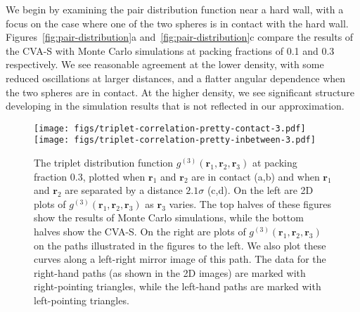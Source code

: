 \documentclass[letterpaper,twocolumn,amsmath,amssymb,pre,aps,10pt]{revtex4-1}
\newcommand{\rr}{\textbf{r}}
\begin{document}
We begin by examining the pair distribution function near a hard wall,
with a focus on the case where one of the two spheres is in contact
with the hard wall.  Figures~\ref{fig:pair-distribution}a
and~\ref{fig:pair-distribution}c compare the results of the CVA-S with
Monte Carlo simulations at packing fractions of 0.1 and 0.3
respectively. We see reasonable agreement at the lower density, with
some reduced oscillations at larger distances, and a flatter angular
dependence when the two spheres are in contact.  At the higher
density, we see significant structure developing in the simulation
results that is not reflected in our approximation.

\begin{figure*}
  \texttt{[image: figs/triplet-correlation-pretty-contact-3.pdf]}
  \vspace{-0.7cm}
\\
  \texttt{[image: figs/triplet-correlation-pretty-inbetween-3.pdf]}
  \vspace{-0.7cm}
  \caption{The triplet distribution function
    $g^{(3)}(\rr_1,\rr_2,\rr_3)$ at packing fraction 0.3, plotted when
    $\rr_1$ and $\rr_2$ are in contact (a,b) and when $\rr_1$ and
    $\rr_2$ are separated by a distance $2.1\sigma$ (c,d). On the left
    are 2D plots of $g^{(3)}(\rr_1,\rr_2,\rr_3)$ as $\rr_3$
    varies. %
%
    The top halves of these figures show the results of Monte Carlo
    simulations, while the bottom halves show the CVA-S.  On the right
    are plots of $g^{(3)}(\rr_1,\rr_2,\rr_3)$ on the paths illustrated
    in the figures to the left.
%
    We also plot these curves along a left-right mirror image of this
    path.  The data for the right-hand paths (as shown in the 2D
    images) are marked with right-pointing triangles, while the
    left-hand paths are marked with left-pointing triangles.
%
  }
  \label{fig:triplet-contact-distribution}
\end{figure*}
\end{document}
